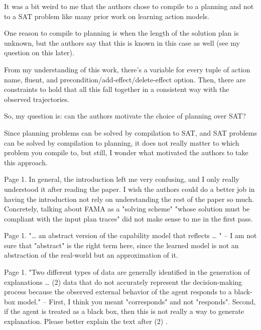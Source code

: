 \documentclass{article}
\begin{document}
\begin{mdframed}[hidealllines=true,backgroundcolor=gray!20]
  It was a bit weird to me that the authors chose to compile to a planning and not to a SAT problem like many prior work on learning action models.

One reason to compile to planning is when the length of the solution plan is unknown, but the authors say that this is known in this case as well (see my question on this later).

From my understanding of this work, there's a variable for every tuple of action name, fluent, and precondition/add-effect/delete-effect option. Then, there are constraints to hold that all this fall together in a consistent way with the observed trajectories.

So, my question is: can the authors motivate the choice of planning over SAT?

Since planning problems can be solved by compilation to SAT, and SAT problems can be solved by compilation to planning, it does not really matter to which problem you compile to, but still, I wonder what motivated the authors to take this approach.
\end{mdframed}

\begin{mdframed}[hidealllines=true,backgroundcolor=gray!20]
  Page 1. In general, the introduction left me very confusing, and I only really understood it after reading the paper. I wish the authors could do a better job in having the introduction not rely on understanding the rest of the paper so much. Concretely, talking about FAMA as a "solving scheme" "whose solution must be compliant with the input plan traces" did not make sense to me in the first pass.
\end{mdframed}

\begin{mdframed}[hidealllines=true,backgroundcolor=gray!20]
    Page 1. "… an abstract version of the capability model that reflects … " – I am not sure that "abstract" is the right term here, since the learned model is not an abstraction of the real-world but an approximation of it.
\end{mdframed}

\begin{mdframed}[hidealllines=true,backgroundcolor=gray!20]
    Page 1.  "Two different types of data are generally identified in the generation of explanations … (2) data that do not accurately represent the decision-making process because the observed external behavior of the agent responds to a black-box model." – First, I think you meant "corresponds" and not "responds". Second, if the agent is treated as a black box, then this is not really a way to generate explanation. Please better explain the text after (2) .
\end{mdframed}
\end{document}
